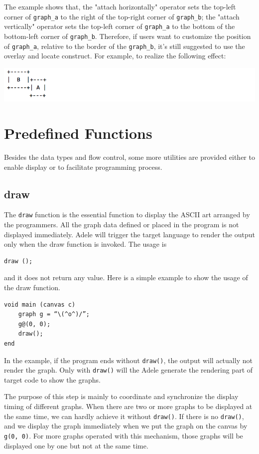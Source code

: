 \documentclass[11pt,letterpaper]{article}
\begin{document}
The example shows that, the "attach horizontally" operator sets the top-left corner of \texttt{graph\_a} to the right of the top-right corner of \texttt{graph\_b}; the "attach vertically" operator sets the top-left corner of \texttt{graph\_a} to the bottom of the bottom-left corner of \texttt{graph\_b}. Therefore, if users want to customize the position of \texttt{graph\_a}, relative to the border of the \texttt{graph\_b}, it's still suggested to use the overlay and locate construct. For example, to realize the following effect:

\includegraphics[width=\textwidth]{./graph_03.png}

\section {Predefined Functions}

Besides the data types and flow control, some more utilities are provided either to enable display or to facilitate programming process.

\subsection {draw}
The \texttt{draw} function is the essential function to display the ASCII art arranged by the programmers. All the graph data defined or placed in the program is not displayed immediately. Adele will trigger the target language to render the output only when the draw function is invoked. The usage is
\begin{lstlisting}[tabsize=4] 
	draw (); 
\end{lstlisting}
and it does not return any value. Here is a simple example to show the usage of the draw function.
\pagebreak
\begin{lstlisting}[tabsize=4, frame=single]
void main (canvas c)
	graph g = “\(^o^)/”;
	g@(0, 0);
	draw();
end
\end{lstlisting}

In the example, if the program ends without \texttt{draw()}, the output will actually not render the graph. Only with \texttt{draw()} will the Adele generate the rendering part of target code to show the graphs.

The purpose of this step is mainly to coordinate and synchronize the display timing of different graphs. When there are two or more graphs to be displayed at the same time, we can hardly achieve it without \texttt{draw()}. If there is no \texttt{draw()}, and we display the graph immediately when we put the graph on the canvas by \texttt{g\@(0, 0)}. For more graphs operated with this mechanism, those graphs will be displayed one by one but not at the same time.
\end{document}
